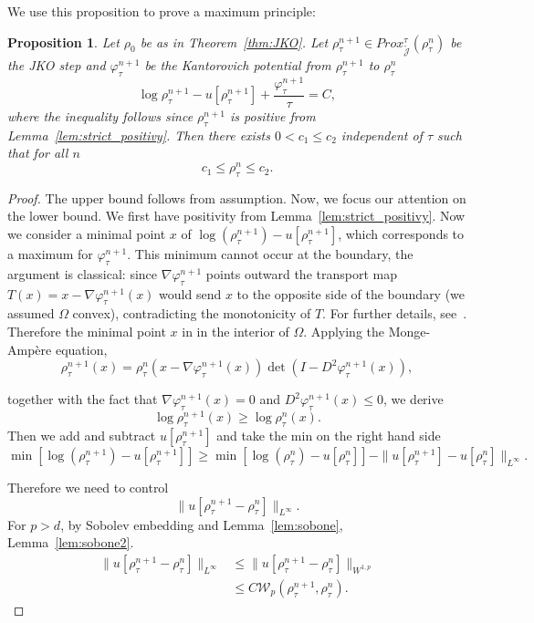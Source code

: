 \documentclass[a4paper,twosided, 11pt]{article}
\renewcommand{\color}[2][]{}
\newcommand {\f}   {\frac}
\theoremstyle{plain}
\newtheorem{proposition}[thm]{Proposition}
\theoremstyle{remark}
\numberwithin{equation}{section}
\begin{document}
We use this proposition to prove a maximum principle:

\begin{proposition}\label{prop:JKO_maximum_principle}
Let $\rho_{0}$ be as in Theorem~\ref{thm:JKO}. Let $\rho^{n+1}_{\tau}\in Prox_{\widetilde{\mathcal{J}}}^{\tau}(\rho^{n}_{\tau})$ be the JKO step and $\varphi^{n+1}_{\tau}$ be the Kantorovich potential from $\rho^{n+1}_{\tau}$ to $\rho^{n}_{\tau}$
$$
\log\rho^{n+1}_{\tau} - u[\rho^{n+1}_{\tau}] + \f{\varphi^{n+1}_{\tau}}{\tau}=C,
$$
{\color{blue} where the inequality follows since $\rho_{\tau}^{n+1}$ is positive from Lemma~\ref{lem:strict_positivy}}.
Then there exists $0<c_1\le c_2$ independent of $\tau$ such that for all $n$
$$
c_1\le \rho^{n}_{\tau}\le c_2.
$$
\end{proposition}

\begin{proof}
The upper bound follows from assumption. Now, we focus our attention on the lower bound. {\color{blue}We first have positivity from Lemma~\ref{lem:strict_positivy}}. Now we consider a minimal point $x$ of  $\log(\rho^{n+1}_{\tau}) -  u[\rho^{n+1}_{\tau}]$, which corresponds to a maximum for $\varphi^{n+1}_{\tau}$. This minimum cannot occur at the boundary, the argument is classical: since $\nabla \varphi^{n+1}_{\tau}$ points outward the transport map $T(x) = x - \nabla \varphi^{n+1}_{\tau}(x)$ would send $x$ to the opposite side of the boundary (we assumed $\Omega$ convex), contradicting the monotonicity of $T$. For further details, see~\cite[Proof of Lemma 2.4]{iacobelli2019weighted}. Therefore the minimal point $x$ in in the interior of $\Omega$. Applying the Monge-Ampère equation, 
$$
\rho^{n+1}_{\tau}(x) = \rho^{n}_{\tau}(x-\nabla\varphi^{n+1}_{\tau}(x))\det(I-D^{2}\varphi^{n+1}_{\tau}(x)),
$$

together with the fact that $\nabla\varphi^{n+1}_{\tau}(x) =0$ and $D^2 \varphi^{n+1}_{\tau}(x) \le 0$, we derive 
$$
\log\rho^{n+1}_{\tau}(x)\ge \log \rho^{n}_{\tau}(x).
$$ Then we add and subtract $u[\rho^{n+1}_{\tau}]$ and take the min on the right hand side
$$
\min [\log(\rho^{n+1}_{\tau})- u[\rho^{n+1}_{\tau}]] \ge \min [\log(\rho^{n}_{\tau}) - u[\rho^{n}_{\tau}]] - \|u[\rho^{n+1}_{\tau}]-u[\rho^{n}_{\tau}]\|_{L^{\infty}}.
$$

Therefore we need to control
$$
\|u[\rho^{n+1}_{\tau}-\rho^{n}_{\tau}]\|_{L^{\infty}}.
$$
For $p>d$, by Sobolev embedding and Lemma~\ref{lem:sobone}, Lemma~\ref{lem:sobone2}.
\begin{align*}
\|u[\rho^{n+1}_{\tau}-\rho^{n}_{\tau}]\|_{L^{\infty}}&\le \|u[\rho^{n+1}_{\tau}-\rho^{n}_{\tau}]\|_{W^{1,p}} \\
&\le C\mathcal{W}_{p}(\rho^{n+1}_{\tau},\rho^{n}_{\tau}).
\end{align*}


\end{proof}
\end{document}
